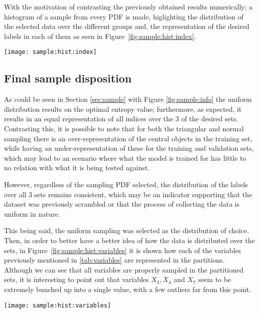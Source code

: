 With the motivation of contrasting the previously obtained results numerically;
a histogram of a sample from every PDF is made, higlighting the distribution of
the selected data over the different groups and, the representation of the
desired labels in each of them as seen in Figure~\ref{fig:sample:hist:index}.

\begin{figure*}[ht]
    \texttt{[image: sample:hist:index]}
    \caption{Distribution of indices over data sets. \label{fig:sample:hist:index}}
\end{figure*}

\subsection{Final sample disposition\label{sec:sample:final}}

As could be seen in Section \ref{sec:sample} with Figure \ref{fig:sample:info}
the uniform distribution results on the optimal entropy value; furthermore, as
expected, it results in an equal representation of all indices over the $3$ of
the desired sets. Contrasting this, it is possible to note that for both the
triangular and normal sampling there is an over-representation of the central
objects in the training set, while having an under-representation of these for
the training and validation sets, which may lead to an scenario where what the
model is trained for has little to no relation with what it is being tested
against.

However, regardless of the sampling PDF selected, the distribution of the labels
over all $3$ sets remains consistent, which may be an indicator supporting that the
dataset was previously scrambled or that the process of collecting the data is
uniform in nature.

This being said, the uniform sampling was selected as the distribution of
choice. Then, in order to better have a better idea of how the data is
distributed over the sets, in Figure~\ref{fig:sample:hist:variables} it is shown
how each of the variables previously mentioned in \ref{tab:variables} are
represented in the partitions. Although we can see that all variables are
properly sampled in the partitioned sets, it is interesting to point out that
variables $X_3, X_4$ and $X_7$ seem to be extremely bunched up into a single
value, with a few outliers far from this point. 

\begin{figure*}[ht]
    \texttt{[image: sample:hist:variables]}
    \caption{Distribution of input variables over sampling \label{fig:sample:hist:variables}}
\end{figure*}

